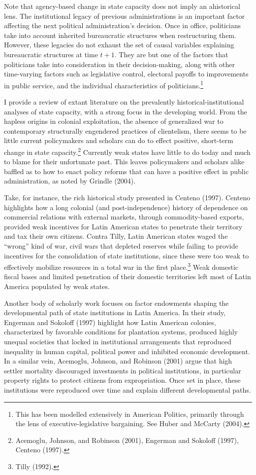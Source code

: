 \documentclass[12pt,]{article}
\let\rmarkdownfootnote\footnote%
\def\footnote{\protect\rmarkdownfootnote}
\begin{document}
Note that agency-based change in state capacity does not imply an
ahistorical lens. The institutional legacy of previous administrations
is an important factor affecting the next political administration's
decision. Once in office, politicians take into account inherited
bureaucratic structures when restructuring them. However, these legacies
do not exhaust the set of causal variables explaining bureaucratic
structures at time \(t + 1\). They are but one of the factors that
politicians take into consideration in their decision-making, along with
other time-varying factors such as legislative control, electoral
payoffs to improvements in public service, and the individual
characteristics of politicians.\footnote{This has been modelled
  extensively in American Politics, primarily through the lens of
  executive-legislative bargaining. See Huber and McCarty (2004).}

I provide a review of extant literature on the prevalently
historical-institutional analyses of state capacity, with a strong focus
in the developing world. From the hapless origins in colonial
exploitation, the absence of generalized war to contemporary
structurally engendered practices of clientelism, there seems to be
little current policymakers and scholars can do to effect positive,
short-term change in state capacity.\footnote{Acemoglu, Johnson, and
  Robinson (2001), Engerman and Sokoloff (1997), Centeno (1997).}
Currently weak states have little to do today and much to blame for
their unfortunate past. This leaves policymakers and scholars alike
baffled as to how to enact policy reforms that can have a positive
effect in public administration, as noted by Grindle (2004).

Take, for instance, the rich historical study presented in Centeno
(1997). Centeno highlights how a long colonial (and post-independence)
history of dependence on commercial relations with external markets,
through commodity-based exports, provided weak incentives for Latin
American states to penetrate their territory and tax their own citizens.
Contra Tilly, Latin American states waged the ``wrong'' kind of war,
civil wars that depleted reserves while failing to provide incentives
for the consolidation of state institutions, since these were too weak
to effectively mobilize resources in a total war in the first
place.\footnote{Tilly (1992).} Weak domestic fiscal bases and limited
penetration of their domestic territories left most of Latin America
populated by weak states.

Another body of scholarly work focuses on factor endowments shaping the
developmental path of state institutions in Latin America. In their
study, Engerman and Sokoloff (1997) highlight how Latin American
colonies, characterized by favorable conditions for plantation systems,
produced highly unequal societies that locked in institutional
arrangements that reproduced inequality in human capital, political
power and inhibited economic development. In a similar vein, Acemoglu,
Johnson, and Robinson (2001) argue that high settler mortality
discouraged investments in political institutions, in particular
property rights to protect citizens from expropriation. Once set in
place, these institutions were reproduced over time and explain
different developmental paths.
\end{document}
